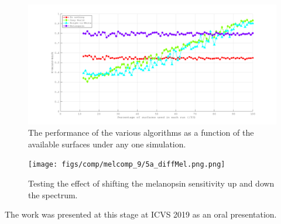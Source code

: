 \begin{figure}[htbp]
 \includegraphics[max width=\textwidth]{figs/comp/melcomp_9/4a_summary.png}
 \caption{The performance of the various algorithms as a function of the available surfaces under any one simulation.}
 \label{fig:4asum}
\end{figure} 

\begin{figure}[htbp]
 \texttt{[image: figs/comp/melcomp\_9/5a\_diffMel.png.png]}
 \caption{Testing the effect of shifting the melanopsin sensitivity up and down the spectrum.}
 \label{fig:9opt}
\end{figure} 

The work was presented at this stage at ICVS 2019 as an oral presentation.